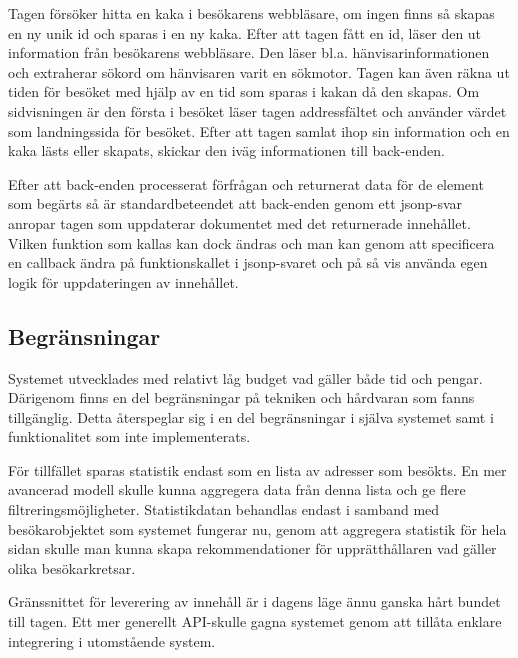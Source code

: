 Tagen försöker hitta en kaka i besökarens webbläsare, om ingen finns så skapas en ny unik id och sparas i en ny kaka. Efter att tagen fått en id, läser den ut information från besökarens webbläsare. Den läser bl.a. hänvisarinformationen och extraherar sökord om hänvisaren varit en sökmotor. Tagen kan även räkna ut tiden för besöket med hjälp av en tid som sparas i kakan då den skapas. Om sidvisningen är den första i besöket läser tagen addressfältet och använder värdet som landningssida för besöket. Efter att tagen samlat ihop sin information och en kaka lästs eller skapats, skickar den iväg informationen till back-enden.

Efter att back-enden processerat förfrågan och returnerat data för de element som begärts så är standardbeteendet att back-enden genom ett \gls{jsonp}-svar anropar tagen som uppdaterar dokumentet med det returnerade innehållet. Vilken funktion som kallas kan dock ändras och man kan genom att specificera en callback ändra på funktionskallet i \gls{jsonp}-svaret och på så vis använda egen logik för uppdateringen av innehållet.

\subsection{Begränsningar}

Systemet utvecklades med relativt låg budget vad gäller både tid och pengar. Därigenom finns en del begränsningar på tekniken och hårdvaran som fanns tillgänglig. Detta återspeglar sig i en del begränsningar i själva systemet samt i funktionalitet som inte implementerats.

För tillfället sparas statistik endast som en lista av adresser som besökts. En mer avancerad modell skulle kunna aggregera data från denna lista och ge flere filtreringsmöjligheter. Statistikdatan behandlas endast i samband med besökarobjektet som systemet fungerar nu, genom att aggregera statistik för hela sidan skulle man kunna skapa rekommendationer för upprätthållaren vad gäller olika besökarkretsar.

Gränssnittet för leverering av innehåll är i dagens läge ännu ganska hårt bundet till tagen. Ett mer generellt API-skulle gagna systemet genom att tillåta enklare integrering i utomstående system.

